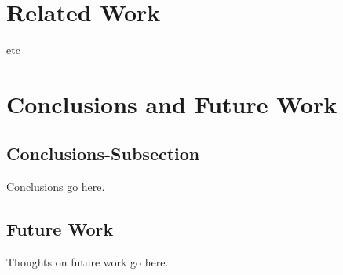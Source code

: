 \documentclass[10pt]{article}
\begin{document}
\section{Related Work}
\label{sec:Related}
etc

\section{Conclusions and Future Work}

\subsection{Conclusions-Subsection}
\label{sec:Conclusions-Subsection}

Conclusions go here. 

\subsection{Future Work}
\label{sec:Future Work}
Thoughts on future work go here.



\end{document}
